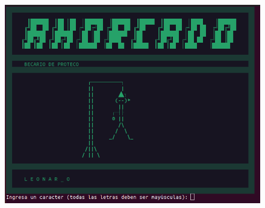 \documentclass[letter,12pt]{article} %
\begin{document}
\begin{figure}[H]
	\centering
	\includegraphics[scale=0.6]{imagenes/ahorcado3.png}
\end{figure}
\end{document}
